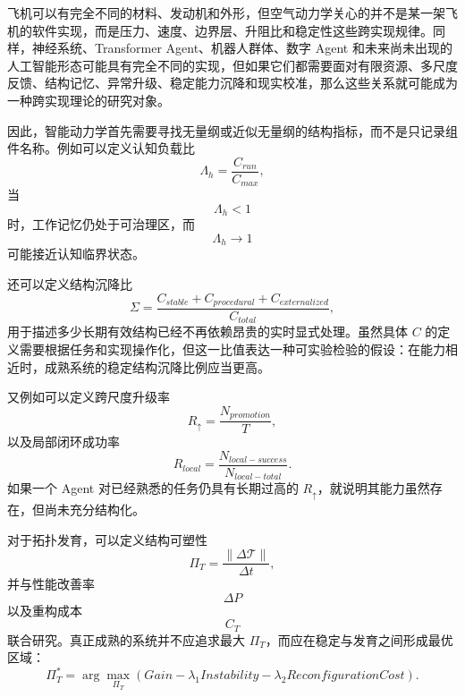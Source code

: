 飞机可以有完全不同的材料、发动机和外形，但空气动力学关心的并不是某一架飞机的软件实现，而是压力、速度、边界层、升阻比和稳定性这些跨实现规律。同样，神经系统、Transformer Agent、机器人群体、数字 Agent 和未来尚未出现的人工智能形态可能具有完全不同的实现，但如果它们都需要面对有限资源、多尺度反馈、结构记忆、异常升级、稳定能力沉降和现实校准，那么这些关系就可能成为一种跨实现理论的研究对象。

因此，智能动力学首先需要寻找无量纲或近似无量纲的结构指标，而不是只记录组件名称。例如可以定义认知负载比
\begin{equation}
\Lambda_h
=
\frac{C_{run}}{C_{max}},
\end{equation}
当
\begin{equation}
\Lambda_h<1
\end{equation}
时，工作记忆仍处于可治理区，而
\begin{equation}
\Lambda_h\rightarrow1
\end{equation}
可能接近认知临界状态。

还可以定义结构沉降比
\begin{equation}
\Sigma
=
\frac{
C_{stable}+C_{procedural}+C_{externalized}
}{
C_{total}
},
\end{equation}
用于描述多少长期有效结构已经不再依赖昂贵的实时显式处理。虽然具体 $C$ 的定义需要根据任务和实现操作化，但这一比值表达一种可实验检验的假设：在能力相近时，成熟系统的稳定结构沉降比例应当更高。

又例如可以定义跨尺度升级率
\begin{equation}
R_{\uparrow}
=
\frac{N_{promotion}}{T},
\end{equation}
以及局部闭环成功率
\begin{equation}
R_{local}
=
\frac{N_{local-success}}
{N_{local-total}}.
\end{equation}
如果一个 Agent 对已经熟悉的任务仍具有长期过高的 $R_{\uparrow}$，就说明其能力虽然存在，但尚未充分结构化。

对于拓扑发育，可以定义结构可塑性
\begin{equation}
\Pi_T
=
\frac{
\|\Delta\mathcal{T}\|
}{
\Delta t
},
\end{equation}
并与性能改善率
\begin{equation}
\Delta P
\end{equation}
以及重构成本
\begin{equation}
C_T
\end{equation}
联合研究。真正成熟的系统并不应追求最大 $\Pi_T$，而应在稳定与发育之间形成最优区域：
\begin{equation}
\Pi_T^{*}
=
\arg\max_{\Pi_T}
\left(
Gain
-
\lambda_1Instability
-
\lambda_2ReconfigurationCost
\right).
\end{equation}

